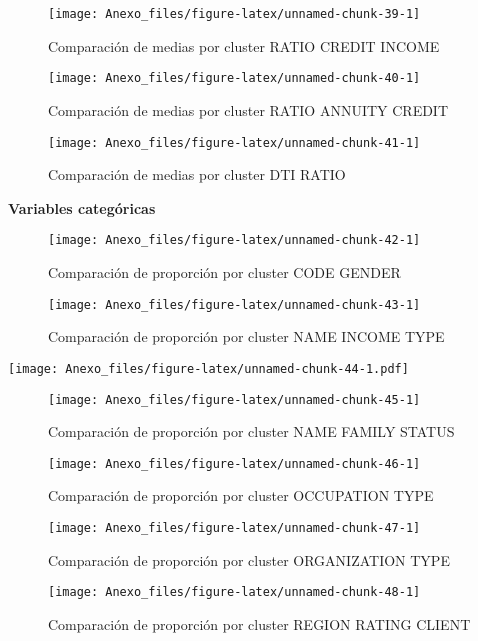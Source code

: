 \documentclass[
]{article}
\begin{document}
\begin{figure}
\texttt{[image: Anexo\_files/figure-latex/unnamed-chunk-39-1]} \caption{Comparación de medias por cluster RATIO CREDIT INCOME}\label{fig:unnamed-chunk-39}
\end{figure}

\begin{figure}
\texttt{[image: Anexo\_files/figure-latex/unnamed-chunk-40-1]} \caption{Comparación de medias por cluster RATIO ANNUITY CREDIT}\label{fig:unnamed-chunk-40}
\end{figure}

\begin{figure}
\texttt{[image: Anexo\_files/figure-latex/unnamed-chunk-41-1]} \caption{Comparación de medias por cluster DTI RATIO}\label{fig:unnamed-chunk-41}
\end{figure}

\textbf{Variables categóricas}

\begin{figure}
\texttt{[image: Anexo\_files/figure-latex/unnamed-chunk-42-1]} \caption{Comparación de proporción por cluster CODE GENDER}\label{fig:unnamed-chunk-42}
\end{figure}

\begin{figure}
\texttt{[image: Anexo\_files/figure-latex/unnamed-chunk-43-1]} \caption{Comparación de proporción por cluster NAME INCOME TYPE}\label{fig:unnamed-chunk-43}
\end{figure}

\texttt{[image: Anexo\_files/figure-latex/unnamed-chunk-44-1.pdf]}

\begin{figure}
\texttt{[image: Anexo\_files/figure-latex/unnamed-chunk-45-1]} \caption{Comparación de proporción por cluster NAME FAMILY STATUS}\label{fig:unnamed-chunk-45}
\end{figure}

\begin{figure}
\texttt{[image: Anexo\_files/figure-latex/unnamed-chunk-46-1]} \caption{Comparación de proporción por cluster OCCUPATION TYPE}\label{fig:unnamed-chunk-46}
\end{figure}

\begin{figure}
\texttt{[image: Anexo\_files/figure-latex/unnamed-chunk-47-1]} \caption{Comparación de proporción por cluster ORGANIZATION TYPE}\label{fig:unnamed-chunk-47}
\end{figure}

\begin{figure}
\texttt{[image: Anexo\_files/figure-latex/unnamed-chunk-48-1]} \caption{Comparación de proporción por cluster REGION RATING CLIENT}\label{fig:unnamed-chunk-48}
\end{figure}
\end{document}
